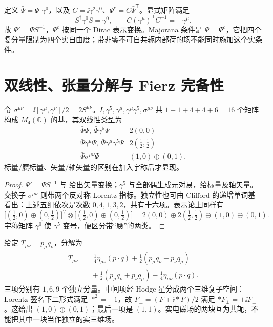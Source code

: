 \begin{definition}
定义 $\bar\Psi=\Psi^\dagger\gamma^0$，以及 $C=\ii\gamma^2\gamma^0$、$\Psi^c=C\bar\Psi^{\mathsf T}$。显式矩阵满足
\[
 S^\dagger\gamma^0S=\gamma^0,\qquad
 C(\gamma^\mu)^{\mathsf T}C^{-1}=-\gamma^\mu.
\]
故 $\bar\Psi' =\bar\Psi S^{-1}$，$\Psi^c$ 按同一个 Dirac 表示变换。Majorana 条件是 $\Psi=\Psi^c$，它把四个复分量限制为四个实自由度；带非零不可自共轭内部荷的场不能同时施加这个实条件。
\end{definition}

\section{双线性、张量分解与 Fierz 完备性}

\begin{proposition}
令 $\sigma^{\mu\nu}=\ii[\gamma^\mu,\gamma^\nu]/2=2S^{\mu\nu}$。$I,\gamma^5,\gamma^\mu,\gamma^\mu\gamma^5,\sigma^{\mu\nu}$ 共 $1+1+4+4+6=16$ 个矩阵构成 $M_4(\mathbb C)$ 的基，其双线性类型为
\begin{equation}
\begin{array}{c|c}
 \bar\Psi\Psi,\ \bar\Psi\gamma^5\Psi&2(0,0)\\
 \bar\Psi\gamma^\mu\Psi,\ \bar\Psi\gamma^\mu\gamma^5\Psi&2(\tfrac12,\tfrac12)\\
 \bar\Psi\sigma^{\mu\nu}\Psi&(1,0)\oplus(0,1).
\end{array}
\label{eq:bilinear-classification}
\end{equation}
标量/赝标量、矢量/轴矢量的区别在加入宇称后才显现。
\end{proposition}
\begin{proof}
$\bar\Psi'=\bar\Psi S^{-1}$ 与  给出矢量变换；$\gamma^5$ 与全部偶生成元对易，给标量及轴矢量。交换子 $\sigma^{\mu\nu}$ 则带两个反对称 Lorentz 指标。独立性也可由 Clifford 的递增单词基看出：上述五组依次是次数 $0,4,1,3,2$，共有十六项。表示论上同样有
\[
 \bigl[(\tfrac12,0)\oplus(0,\tfrac12)\bigr]^\vee
 \otimes\bigl[(\tfrac12,0)\oplus(0,\tfrac12)\bigr]
 =2(0,0)\oplus2(\tfrac12,\tfrac12)\oplus(1,0)\oplus(0,1).
\]
宇称矩阵 $\gamma^0$ 使 $\gamma^5$ 变号，便区分带“赝”的两类。
\end{proof}

\begin{workedexample}[两个四矢量的乘积]
给定 $T_{\mu\nu}=p_\mu q_\nu$，分解为
\begin{align*}
 T_{\mu\nu}&=\frac14\eta_{\mu\nu}(p\cdot q)
 +\frac12(p_\mu q_\nu-p_\nu q_\mu)\\
 &\quad+\frac12(p_\mu q_\nu+p_\nu q_\mu)-\frac14\eta_{\mu\nu}(p\cdot q).
\end{align*}
三项分别有 $1,6,9$ 个独立分量。中间项经 Hodge 星分成两个三维复子空间：Lorentz 签名下二形式满足 $*^2=-1$，故 $F_\pm=(F\mp\ii *F)/2$ 满足 $*F_\pm=\pm\ii F_\pm$。这给出 $(1,0)\oplus(0,1)$；最后一项是 $(1,1)$。实电磁场的两块互为共轭，不能把其中一块当作独立的实三维场。
\end{workedexample}

